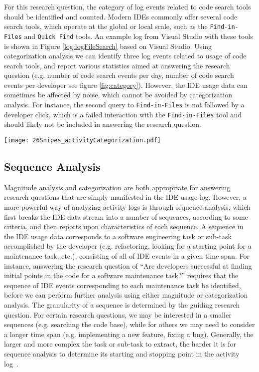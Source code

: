 For this research question, the category of log events related to code search tools should be identified and counted. Modern IDEs commonly offer several code search tools, which operate at the global or local scale, such as the {\tt Find-in-Files} and {\tt Quick Find} tools.  An example log from Visual Studio with these tools is shown in Figure \ref{log:logFileSearch} based on Visual Studio. Using categorization analysis we can identify three
log events related to usage of code search tools, and report various statistics aimed at answering the research question (e.g. number of code search events per day, number of code search events per developer see figure \ref{fig:category}). However, the IDE usage data can sometimes be affected by noise, which cannot be avoided by categorization analysis. For instance, the second query to {\tt Find-in-Files} is not followed by a developer click, which is a failed interaction with the {\tt Find-in-Files} tool and should likely not be included in answering the research question.


\begin{figure*}[t]
\centering

\texttt{[image: 26Snipes\_activityCategorization.pdf]}
\caption{Categorized Log Events with Search Category}
\label{fig:category}
\end{figure*}


\subsection{Sequence Analysis}

Magnitude analysis and categorization are both appropriate for answering research questions that are simply manifested in the IDE usage log. However, a more powerful way of analyzing activity logs is through sequence analysis, which first breaks the IDE data stream into a number of sequences, according to some criteria, and then reports upon characteristics of each sequence. A sequence in the IDE usage data corresponds to a software engineering task or sub-task accomplished by the developer (e.g. refactoring, looking for a starting point for a maintenance task, etc.), consisting of all of IDE events in a given time span. For instance, answering the research question of ``Are developers successful at finding initial points in the code for a software maintenance task?'' requires that the sequence of IDE events corresponding to each maintenance task be identified, before we can perform further analysis using either magnitude or categorization analysis. The granularity of a sequence is determined by the guiding research question. For certain research questions, we may be interested in a smaller sequences (e.g. searching the code base), while for others we may need to consider a longer time span (e.g. implementing a new feature, fixing a bug). 
Generally, the larger and more complex the task or sub-task to extract, the harder it is for sequence analysis to determine its starting and stopping point in the activity log~\cite{Zou-ComanIndustry}.

